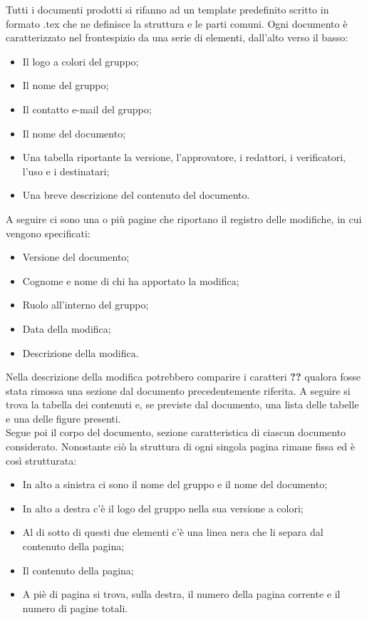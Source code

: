 Tutti i documenti prodotti si rifanno ad un template predefinito scritto in formato .tex che ne definisce la struttura
e le parti comuni. Ogni documento è caratterizzato nel frontespizio da una serie di elementi, dall'alto verso il basso:
\begin{itemize}
    \item Il logo a colori del gruppo;
    \item Il nome del gruppo;
    \item Il contatto e-mail del gruppo;
    \item Il nome del documento;
    \item Una tabella riportante la versione, l'approvatore, i redattori, i verificatori, l'uso e i destinatari;
    \item Una breve descrizione del contenuto del documento.
\end{itemize}
A seguire ci sono una o più pagine che riportano il registro delle modifiche, in cui vengono specificati:
\begin{itemize}
    \item Versione del documento;
    \item Cognome e nome di chi ha apportato la modifica;
    \item Ruolo all'interno del gruppo;
    \item Data della modifica;
    \item Descrizione della modifica.
\end{itemize}
Nella descrizione della modifica potrebbero comparire i caratteri \textbf{??} qualora fosse stata rimossa una sezione dal documento
precedentemente riferita.
A seguire si trova la tabella dei contenuti e, se previste dal documento, una lista delle tabelle e una delle figure presenti.\\
Segue poi il corpo del documento, sezione caratteristica di ciascun documento considerato. Nonostante ciò la struttura
di ogni singola pagina rimane fissa ed è così strutturata:
\begin{itemize}
    \item In alto a sinistra ci sono il nome del gruppo e il nome del documento;
    \item In alto a destra c'è il logo del gruppo nella sua versione a colori;
    \item Al di sotto di questi due elementi c'è una linea nera che li separa dal contenuto della pagina;
    \item Il contenuto della pagina;
    \item A piè di pagina si trova, sulla destra, il numero della pagina corrente e il numero di pagine totali.
\end{itemize}
